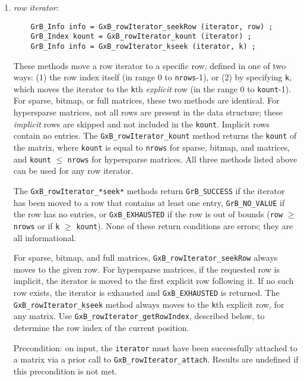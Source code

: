 \documentclass[12pt]{article}
\begin{document}
    \begin{enumerate}
    \item {\em row iterator}: 
    {\footnotesize
    \begin{verbatim}
    GrB_Info info = GxB_rowIterator_seekRow (iterator, row) ;
    GrB_Index kount = GxB_rowIterator_kount (iterator) ;
    GrB_Info info = GxB_rowIterator_kseek (iterator, k) ; \end{verbatim}}

        These methods move a row iterator to a specific row, defined in one of
        two ways: (1) the row index itself (in range 0 to \verb'nrows'-1), or
        (2) by specifying \verb'k', which moves the iterator to the \verb'k'th
        {\em explicit} row (in the range 0 to \verb'kount'-1). For sparse,
        bitmap, or full matrices, these two methods are identical.  For
        hypersparse matrices, not all rows are present in the data structure;
        these {\em implicit} rows are skipped and not included in the
        \verb'kount'.  Implicit rows contain no entries.  The
        \verb'GxB_rowIterator_kount' method returns the \verb'kount' of the
        matrix, where \verb'kount' is equal to \verb'nrows' for sparse, bitmap,
        and matrices, and \verb'kount' $\le$ \verb'nrows' for hypersparse
        matrices.  All three methods listed above can be used for any row
        iterator.

        The \verb'GxB_rowIterator_*seek*' methods return \verb'GrB_SUCCESS' if
        the iterator has been moved to a row that contains at least one entry,
        \verb'GrB_NO_VALUE' if the row has no entries, or \verb'GxB_EXHAUSTED'
        if the row is out of bounds (\verb'row' $\ge$ \verb'nrows' or
        if \verb'k' $\ge$ \verb'kount').
        None of these return conditions are
        errors; they are all informational.

        For sparse, bitmap, and full matrices, \verb'GxB_rowIterator_seekRow'
        always moves to the given row.  For hypersparse matrices, if the
        requested row is implicit, the iterator is moved to the first
        explicit row following it.  If no such row exists, the iterator
        is exhausted and \verb'GxB_EXHAUSTED' is returned.
        The \verb'GxB_rowIterator_kseek' method always moves to the \verb'k'th
        explicit row, for any matrix.
        Use \verb'GxB_rowIterator_getRowIndex', described below, to determine
        the row index of the current position.

        Precondition: on input, the \verb'iterator' must have been successfully
        attached to a matrix via a prior call to \verb'GxB_rowIterator_attach'.
        Results are undefined if this precondition is not met.


\end{enumerate}
\end{document}
